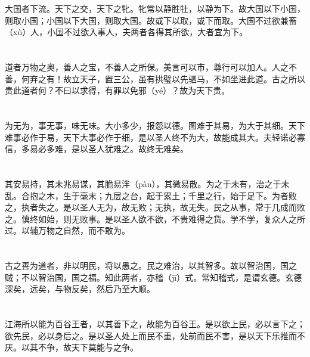 \documentclass[a4paper,12pt,UTF8,twoside]{ctexbook}
\begin{document}
	\chapter{}	
	
	大国者下流。天下之交，天下之牝。牝常以静胜牡，以静为下。故大国以下小国，则取小国；小国以下大国，则取大国。故或下以取，或下而取。大国不过欲兼畜（xù）人，小国不过欲入事人，夫两者各得其所欲，大者宜为下。
	
	\chapter{}	
	
	道者万物之奥，善人之宝，不善人之所保。美言可以市，尊行可以加人。人之不善，何弃之有！故立天子，置三公，虽有拱璧以先驷马，不如坐进此道。古之所以贵此道者何？不曰以求得，有罪以免邪（yé）？故为天下贵。
	
	\chapter{}	
	
	为无为，事无事，味无味。大小多少，报怨以德。图难于其易，为大于其细。天下难事必作于易，天下大事必作于细，是以圣人终不为大，故能成其大。夫轻诺必寡信，多易必多难，是以圣人犹难之。故终无难矣。
	
	\chapter{}	
	
	其安易持，其未兆易谋，其脆易泮（pàn），其微易散。为之于未有，治之于未乱。合抱之木，生于毫末；九层之台，起于累土；千里之行，始于足下。为者败之，执者失之。是以圣人无为，故无败；无执，故无失。民之从事，常于几成而败之。慎终如始，则无败事。是以圣人欲不欲，不贵难得之货。学不学，复众人之所过。以辅万物之自然，而不敢为。
	
	\chapter{}	
	
	古之善为道者，非以明民，将以愚之。民之难治，以其智多。故以智治国，国之贼；不以智治国，国之福。知此两者，亦稽（jī）式。常知稽式，是谓玄德。玄德深矣，远矣，与物反矣，然后乃至大顺。
	
	\chapter{}	
	
	江海所以能为百谷王者，以其善下之，故能为百谷王。是以欲上民，必以言下之；欲先民，必以身后之。是以圣人处上而民不重，处前而民不害，是以天下乐推而不厌。以其不争，故天下莫能与之争。
	
\end{document}
